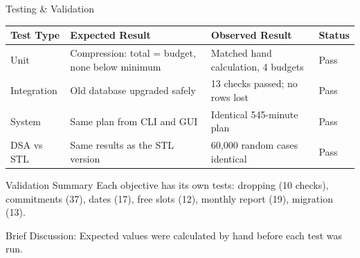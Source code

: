 \documentclass[aspectratio=169,11pt]{beamer}
\newcommand{\smallnote}[1]{%
\vspace{0.08cm}
{\scriptsize\color{GEUGrey}#1}
}
\begin{document}
\begin{frame}{Testing \& Validation}

\scriptsize

\begin{center}

\renewcommand{\arraystretch}{1.35}

\begin{tabularx}{.96\textwidth}
{@{}p{2.0cm}X X p{1.4cm}@{}}

\toprule
Test Type &
Expected Result &
Observed Result &
Status\\
\midrule

Unit &
Compression: total = budget, none below minimum &
Matched hand calculation, 4 budgets &
Pass\\

Integration &
Old database upgraded safely &
13 checks passed; no rows lost &
Pass\\

System &
Same plan from CLI and GUI &
Identical 545-minute plan &
Pass\\

DSA vs STL &
Same results as the STL version &
60,000 random cases identical &
Pass\\

\bottomrule

\end{tabularx}

\end{center}

\vspace{3mm}

\begin{block}{Validation Summary}
Each objective has its own tests: dropping (10 checks), commitments (37), dates (17), free slots (12),
monthly report (19), migration (13).
\end{block}

\smallnote{
Brief Discussion: Expected values were calculated by hand before each test was run.
}

\end{frame}
\end{document}

